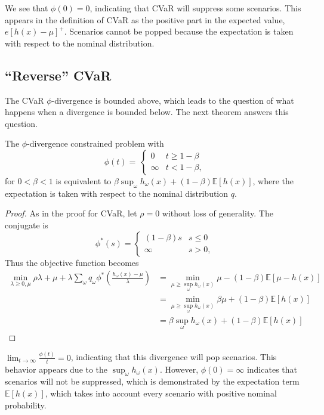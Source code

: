 \documentclass[ijoc,nonblindrev]{informs3} %
\newcommand{\E}{\mathbb{E}}
\newcommand{\e}[1]{\E \left[ #1 \right]}
\begin{document}
\begin{remark}
	We see that $\phi(0) = 0$, indicating that CVaR will suppress some scenarios.
	This appears in the definition of CVaR as the positive part in the expected value, $e{[h(x)-\mu]^+}$.
	Scenarios cannot be popped because the expectation is taken with respect to the nominal distribution.
\end{remark}

\subsection{``Reverse'' CVaR}

The CVaR $\phi$-divergence is bounded above, which leads to the question of what happens when a divergence is bounded below.
The next theorem answers this question.

\begin{theorem} \label{thm:reverse_cvar}
	The $\phi$-divergence constrained problem with
	\[
		\phi(t) = \
		\begin{cases}
			0 & t \geq 1-\beta \\
			\infty & t < 1-\beta,
		\end{cases}
	\]
	for $0 < \beta < 1$ is equivalent to $\beta \sup_\omega h_\omega(x) + (1-\beta)\e{h(x)}$, where the expectation is taken with respect to the nominal distribution $q$.
\end{theorem}

\begin{proof}
	As in the proof for CVaR, let $\rho = 0$ without loss of generality.
	The conjugate is
	\[
		\phi^*(s) = 
		\begin{cases}
			(1-\beta)s & s \leq 0 \\
			\infty & s > 0,
		\end{cases}
	\]
	Thus the objective function becomes
	\begin{align*}
		\min_{\lambda \geq 0,\mu} \rho\lambda + \mu + \lambda \sum_\omega q_\omega \phi^*\left(\frac{h_\omega(x) - \mu}{\lambda}\right) & = \min_{\mu \geq \sup_\omega h_\omega(x)} \mu - (1-\beta)\e{\mu-h(x)} \\
		& = \min_{\mu \geq \sup_\omega h_\omega(x)} \beta \mu + (1-\beta)\e{h(x)} \\
		& = \beta \sup_\omega h_\omega(x) + (1-\beta)\e{h(x)}%
	\end{align*}
\end{proof}

\begin{remark}
	$\lim_{t \rightarrow \infty} \frac{\phi(t)}{t} = 0$, indicating that this divergence will pop scenarios.
	This behavior appears due to the $\sup_\omega h_\omega(x)$.
	However, $\phi(0) = \infty$ indicates that scenarios will not be suppressed, which is demonstrated by the expectation term $\e{h(x)}$, which takes into account every scenario with positive nominal probability.
\end{remark}
\end{document}
